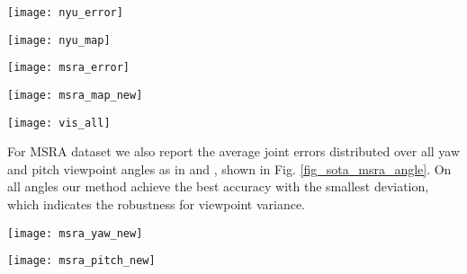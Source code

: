 \documentclass[10pt,twocolumn,letterpaper]{article}
\begin{document}
\begin{figure*}[htb]
\begin{minipage}[b]{0.49\textwidth}
  \centering
  \centerline{\texttt{[image: nyu\_error]}}
\end{minipage}
\begin{minipage}[b]{0.49\textwidth}
  \centering
  \centerline{\texttt{[image: nyu\_map]}}
\end{minipage}
\caption{Comparison with state-of-the-arts on NYU \cite{tompson2014real} datasets: distance error (left) and percentage of success frames (right).}
\label{fig_sota_nyu}
\end{figure*}


\begin{figure*}[htb]
\begin{minipage}[b]{0.49\textwidth}
  \centering
  \centerline{\texttt{[image: msra\_error]}}
\end{minipage}
\begin{minipage}[b]{0.49\textwidth}
  \centering
  \centerline{\texttt{[image: msra\_map\_new]}}
\end{minipage}
\caption{Comparison with state-of-the-arts on MSRA \cite{sun2015cascaded} datasets: distance error (left) and percentage of success frames (right).}
\label{fig_sota_msra}
\end{figure*}


\begin{figure*}[htb]
\centering
{\texttt{[image: vis\_all]}}
\caption{Example results on ICVL \cite{tang2014latent}, NYU \cite{tompson2014real} and MSRA \cite{sun2015cascaded} datasets: ground truth (first row) and region ensemble network (second row) for each datasets.}
\label{fig_vis_all}
\end{figure*}


For MSRA dataset we also report the average joint errors distributed over all yaw and pitch viewpoint angles as in \cite{sun2015cascaded} and \cite{gerobust}, shown in Fig. \ref{fig_sota_msra_angle}. On all angles our method achieve the best accuracy with the smallest deviation, which indicates the robustness for viewpoint variance.
\begin{figure*}[htb]
\begin{minipage}[b]{0.49\textwidth}
  \centering
  \centerline{\texttt{[image: msra\_yaw\_new]}}
\end{minipage}
\begin{minipage}[b]{0.49\textwidth}
  \centering
  \centerline{\texttt{[image: msra\_pitch\_new]}}
\end{minipage}
\caption{The average joint errors distributed over all yaw/pitch viewpoint angles on MSRA \cite{sun2015cascaded} dataset. The standard deviations of the error distributions are shown in the legend titles.}
\label{fig_sota_msra_angle}
\end{figure*}
\end{document}
